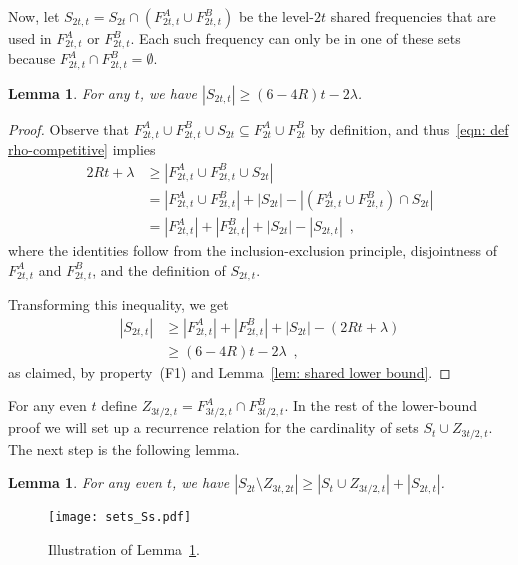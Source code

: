 \documentclass[11pt]{article}
\newtheorem{lemma}[theorem]{Lemma}
\begin{document}
Now, let 
$S_{2t,t} = S_{2t}\cap (F^A_{2t,t}\cup F^B_{2t,t})$ be the level-$2t$ shared frequencies
that are used in $F^A_{2t,t}$ or $F^B_{2t,t}$.
Each such frequency can only be in one of these sets because 
$F^A_{2t,t} \cap F^B_{2t,t} = \emptyset$.



\begin{lemma}\label{lem: S_{2t,t} lower bound}
For any $t$, we have $|S_{2t,t}| \ge (6-4R)t - 2\lambda$.
\end{lemma}

\begin{proof}
Observe that $F^A_{2t,t} \cup F^B_{2t,t} \cup S_{2t} \subseteq F^A_{2t}\cup F^B_{2t}$
by definition, and thus~\eqref{eqn: def rho-competitive} implies
\begin{align*}
2Rt+\lambda 	&\geq |F^A_{2t,t}\cup F^B_{2t,t}\cup S_{2t}|\\
		&= |F^A_{2t,t}\cup F^B_{2t,t}| + |S_{2t}| - |(F^A_{2t,t}\cup F^B_{2t,t}) \cap S_{2t}|\\
		&= |F^A_{2t,t}| + |F^B_{2t,t}| + |S_{2t}| - |S_{2t,t}| \enspace,
\end{align*}
where the identities follow from the inclusion-exclusion principle, disjointness of
$F^A_{2t,t}$ and $F^B_{2t,t}$, and the definition of $S_{2t,t}$. 

Transforming this inequality, we get 
\begin{align*}
|S_{2t,t}| 	&\geq |F^A_{2t,t}| + |F^B_{2t,t}| + |S_{2t}| -(2Rt+\lambda)\\
		&\geq (6-4R)t-2\lambda \enspace,
\end{align*}
as claimed, by property~(F1) and Lemma~\ref{lem: shared lower bound}.
\end{proof}

For any even $t$ define $Z_{3t/2,t} = F^A_{3t/2,t} \cap F^B_{3t/2,t}$.
In the rest of the lower-bound proof we will set up a recurrence
relation for
the cardinality of sets $S_{t}\cup Z_{3t/2,t}$. The next step
is the following lemma.



\begin{lemma}\label{lem: subsets of S_2t - Z_2t}
For any even $t$, we have
$|S_{2t} \setminus Z_{3t,2t}| \ge |S_t\cup Z_{3t/2,t}| + |S_{2t,t}|$.
\end{lemma}


\begin{figure}[t]
\begin{center}
\texttt{[image: sets\_Ss.pdf]}
\caption{Illustration of Lemma~\ref{lem: subsets of S_2t - Z_2t}.}
\label{fig: subsets of S_2t - Z_2t}
\end{center}
\end{figure}
\end{document}
